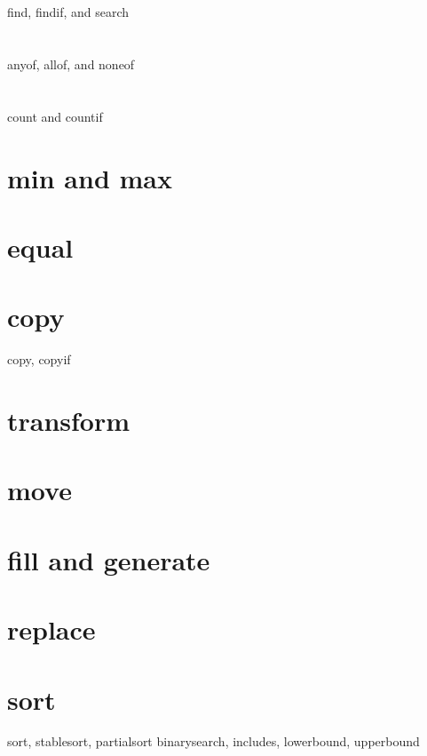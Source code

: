 \section{}\label{sec:algo-find}
find, findif, and search
\section{}\label{sec:algo-any}
anyof, allof, and noneof
\section{}\label{sec:algo-count}
count and countif
\section{min and max}\label{sec:algo-minmax}
\section{equal}\label{sec:algo-equal}
\section{copy}\label{sec:algo-copy}
copy, copyif
\section{transform}\label{sec:algo-transform}
\section{move}\label{sec:algo-move}
\section{fill and generate}\label{sec:algo-fill}
\section{replace}\label{sec:algo-replace}
\section{sort}\label{sec:algo-sort}
sort, stablesort, partialsort
binarysearch, includes, lowerbound, upperbound


